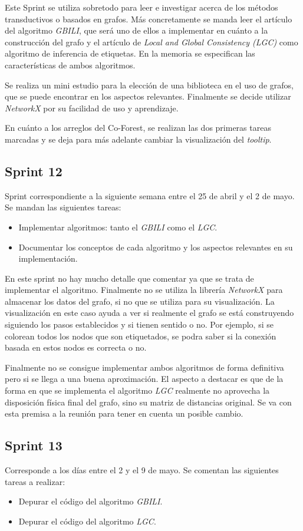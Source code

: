 Este Sprint se utiliza sobretodo para leer e investigar acerca de los métodos transductivos o basados en grafos. Más concretamente se manda leer el artículo del algoritmo \textit{GBILI}, que será uno de ellos a implementar en cuánto a la construcción del grafo y el artículo de \textit{Local and Global Consistency (LGC)} como algoritmo de inferencia de etiquetas. En la memoria se especifican las características de ambos algoritmos.
 
Se realiza un mini estudio para la elección de una biblioteca en el uso de grafos, que se puede encontrar en los aspectos relevantes. Finalmente se decide utilizar \textit{NetworkX} por su facilidad de uso y aprendizaje.

En cuánto a los arreglos del Co-Forest, se realizan las dos primeras tareas marcadas y se deja para más adelante cambiar la visualización del \textit{tooltip}.

\subsection{Sprint 12}
Sprint correspondiente a la siguiente semana entre el 25 de abril y el 2 de mayo. Se mandan las siguientes tareas:
\begin{itemize}
	\item Implementar algoritmos: tanto el \textit{GBILI} como el \textit{LGC}.
	\item Documentar los conceptos de cada algoritmo y los aspectos relevantes en su implementación.
\end{itemize}
En este sprint no hay mucho detalle que comentar ya que se trata de implementar el algoritmo. Finalmente no se utiliza la librería \textit{NetworkX} para almacenar los datos del grafo, si no que se utiliza para su visualización. La visualización en este caso ayuda a ver si realmente el grafo se está construyendo siguiendo los pasos establecidos y si tienen sentido o no. Por ejemplo, si se colorean todos los nodos que son etiquetados, se podra saber si la conexión basada en estos nodos es correcta o no.

Finalmente no se consigue implementar ambos algoritmos de forma definitiva pero si se llega a una buena aproximación. El aspecto a destacar es que de la forma en que se implementa el algoritmo \textit{LGC} realmente no aprovecha la disposición física final del grafo, sino su matriz de distancias original. Se va con esta premisa a la reunión para tener en cuenta un posible cambio.

\subsection{Sprint 13}
Corresponde a los días entre el 2 y el 9 de mayo. Se comentan las siguientes tareas a realizar:
\begin{itemize}
	\item Depurar el código del algoritmo \textit{GBILI}.
	\item Depurar el código del algoritmo \textit{LGC}.
\end{itemize}

